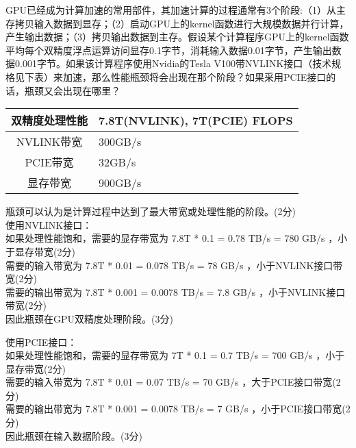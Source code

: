 \documentclass[a4paper, 12pt, answers]{exam}
\begin{document}
\begin{questions}
\begin{solution}[12cm]
\end{solution}


\question[20]
GPU已经成为计算加速的常用部件，其加速计算的过程通常有3个阶段:（1）从主存拷贝输入数据到显存；（2）启动GPU上的kernel函数进行大规模数据并行计算，产生输出数据；（3）拷贝输出数据到主存。假设某个计算程序GPU上的kernel函数平均每个双精度浮点运算访问显存0.1字节，消耗输入数据0.01字节，产生输出数据0.001字节。如果该计算程序使用Nvidia的Tesla V100带NVLINK接口（技术规格见下表）来加速，那么性能瓶颈将会出现在那个阶段？如果采用PCIE接口的话，瓶颈又会出现在哪里？

	\begin{table}[h]
\centering
\begin{tabular}{| c | l |}
	\hline
	双精度处理性能 & 7.8T(NVLINK), 7T(PCIE) FLOPS \\ \hline
	NVLINK带宽 & 300GB/s \\ \hline
	PCIE带宽 & 32GB/s \\ \hline
	显存带宽 & 900GB/s \\ \hline
\end{tabular}
	\end{table}
	\raggedright

\begin{solution}[10cm]
	瓶颈可以认为是计算过程中达到了最大带宽或处理性能的阶段。(2分)\\
	使用NVLINK接口： \\
	如果处理性能饱和，需要的显存带宽为 7.8T * 0.1 = 0.78 TB/s = 780 GB/s ，小于显存带宽(2分)\\
	需要的输入带宽为 7.8T * 0.01 = 0.078 TB/s = 78 GB/s ，小于NVLINK接口带宽(2分)\\
	需要的输出带宽为 7.8T * 0.001 = 0.0078 TB/s = 7.8 GB/s ，小于NVLINK接口带宽(2分)\\
	因此瓶颈在GPU双精度处理阶段。(3分)
	
	使用PCIE接口： \\
	如果处理性能饱和，需要的显存带宽为 7T * 0.1 = 0.7 TB/s = 700 GB/s ，小于显存带宽(2分) \\
	需要的输入带宽为 7.8T * 0.01 = 0.07 TB/s = 70 GB/s ，大于PCIE接口带宽(2分)\\
	需要的输出带宽为 7.8T * 0.001 = 0.0078 TB/s = 7 GB/s ，小于PCIE接口带宽(2分)\\
	因此瓶颈在输入数据阶段。(3分)
	

\end{solution}



\end{questions}
\end{document}
